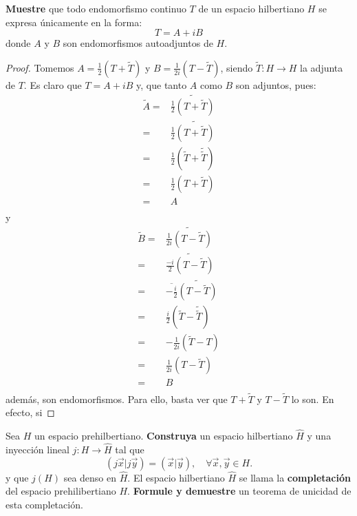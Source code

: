 \documentclass[12pt]{report}
\theoremstyle{largebreak}
\newcommand\cf[3]{\ensuremath{#1:#2\rightarrow#3}}
\newcommand\adj[1]{\ensuremath{\widetilde{#1}}}
\newcommand\pint[2]{\ensuremath{\left(#1\big|#2\right)}}
\newcommand\conj[1]{\ensuremath{\overline{#1}}}
\begin{document}
    \begin{excer}
        \textbf{Muestre} que todo endomorfismo continuo $T$ de un espacio hilbertiano $H$ se expresa únicamente en la forma:
        \begin{equation*}
            T=A+iB
        \end{equation*}
        donde $A$ y $B$ son endomorfismos autoadjuntos de $H$.
    \end{excer}

    \begin{proof}
        Tomemos $A=\frac{1}{2}(T+\adj{T})$ y $B=\frac{1}{2i}(T-\adj{T})$, siendo $\cf{\adj{T}}{H}{H}$ la adjunta de $T$. Es claro que $T=A+iB$ y, que tanto $A$ como $B$ son adjuntos, pues:
        \begin{equation*}
            \begin{split}
                \adj{A}=&\adj{\frac{1}{2}(T+\adj{T})} \\
                =&\frac{1}{2}\adj{(T+\adj{T})} \\
                =&\frac{1}{2}(\adj{T}+\adj{\adj{T}}) \\
                =&\frac{1}{2}(T+\adj{T}) \\
                =&A\\
            \end{split}
        \end{equation*}
        y
        \begin{equation*}
            \begin{split}
                \adj{B}=&\adj{\frac{1}{2i}(T-\adj{T})} \\
                =&\adj{\frac{-i}{2}(T-\adj{T})} \\
                =&\conj{-\frac{i}{2}}\adj{(T-\adj{T})} \\
                =&\frac{i}{2}(\adj{T}-\adj{\adj{T}}) \\
                =&-\frac{1}{2i}(\adj{T}-T) \\
                =&\frac{1}{2i}(T-\adj{T}) \\
                =&B \\
            \end{split}
        \end{equation*}
        además, son endomorfismos. Para ello, basta ver que $T+\adj{T}$ y $T-\adj{T}$ lo son. En efecto, si 
    \end{proof}

    \begin{excer}
        Sea $H$ un espacio prehilbertiano. \textbf{Construya} un espacio hilbertiano $\hat{H}$ y una inyección lineal $\cf{j}{H}{\hat{H}}$ tal que
        \begin{equation*}
            \pint{j\vec{x}}{j\vec{y}}=\pint{\vec{x}}{\vec{y}},\quad\forall\vec{x},\vec{y}\in H.
        \end{equation*}
        y que $j(H)$ sea denso en $\hat{H}$. El espacio hilbertiano $\hat{H}$ se llama la \textbf{completación} del espacio prehilibertiano $H$. \textbf{Formule y demuestre} un teorema de unicidad de esta completación.
    \end{excer}
\end{document}
